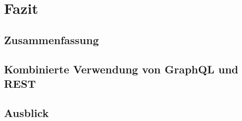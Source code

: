 \chapter{Fazit}

\section{Zusammenfassung}

\section{Kombinierte Verwendung von GraphQL und REST}

\section{Ausblick}
